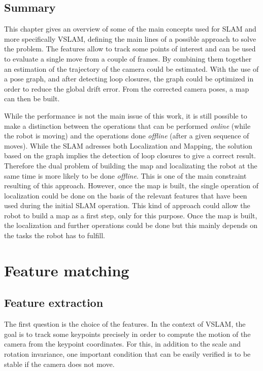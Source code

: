 \clearpage
\section{Summary}

This chapter gives an overview of some of the main concepts used for \gls{SLAM} and more specifically \gls{VSLAM}, defining the main lines of a possible approach to solve the problem. The features allow to track some points of interest and can be used to evaluate a single move from a couple of frames. By combining them together an estimation of the trajectory of the camera could be estimated. With the use of a pose graph, and after detecting loop closures, the graph could be optimized in order to reduce the global drift error. From the corrected camera poses, a map can then be built. 

While the performance is not the main issue of this work, it is still possible to make a distinction between the operations that can be performed \emph{online} (while the robot is moving) and the operations done \emph{offline} (after a given sequence of moves). While the \gls{SLAM} adresses both Localization and Mapping, the solution based on the graph implies the detection of loop closures to give a correct result. Therefore the dual problem of building the map and localizating the robot at the same time is more likely to be done \emph{offline}. This is one of the main constraint resulting of this approach. However, once the map is built, the single operation of localization could be done on the basis of the relevant features that have been used during the initial \gls{SLAM} operation. This kind of approach could allow the robot to build a map as a first step, only for this purpose. Once the map is built, the localization and further operations could be done but this mainly depends on the tasks the robot has to fulfill.

\chapter{Feature matching}
\label{chap:features}

\section{Feature extraction}

The first question is the choice of the features. In the context of \gls{VSLAM}, the goal is to track some keypoints precisely in order to compute the motion of the camera from the keypoint coordinates. For this, in addition to the scale and rotation invariance, one important condition that can be easily verified is to be stable if the camera does not move. 

